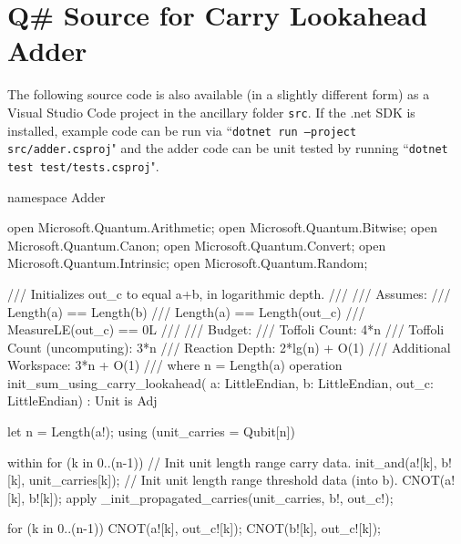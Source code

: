 \documentclass[onecolumn,unpublished]{quantumarticle}
\theoremstyle{definition}
\theoremstyle{definition}
\theoremstyle{definition}
\begin{document}
\section{Q\# Source for Carry Lookahead Adder}
\label{app:carryadder}

The following source code is also available (in a slightly different form) as a Visual Studio Code project in the ancillary folder \texttt{src}.
If the .net SDK is installed, example code can be run via ``\texttt{dotnet run --project src/adder.csproj}" and the adder code can be unit tested by running ``\texttt{dotnet test test/tests.csproj}".

\begin{qsharp}
namespace Adder {
    open Microsoft.Quantum.Arithmetic;
    open Microsoft.Quantum.Bitwise;
    open Microsoft.Quantum.Canon;
    open Microsoft.Quantum.Convert;
    open Microsoft.Quantum.Intrinsic;
    open Microsoft.Quantum.Random;

    /// Initializes out_c to equal a+b, in logarithmic depth.
    ///
    /// Assumes:
    ///     Length(a) == Length(b)
    ///     Length(a) == Length(out_c)
    ///     MeasureLE(out_c) == 0L
    ///
    /// Budget:
    ///     Toffoli Count: 4*n
    ///     Toffoli Count (uncomputing): 3*n
    ///     Reaction Depth: 2*lg(n) + O(1)
    ///     Additional Workspace: 3*n + O(1)
    ///     where n = Length(a)
    operation init_sum_using_carry_lookahead(
            a: LittleEndian,
            b: LittleEndian,
            out_c: LittleEndian) : Unit is Adj {
        let n = Length(a!);
        using (unit_carries = Qubit[n]) {
            within {
                for (k in 0..(n-1)) {
                    // Init unit length range carry data.
                    init_and(a![k], b![k], unit_carries[k]);
                    // Init unit length range threshold data (into b).
                    CNOT(a![k], b![k]);
                }
            } apply {
                _init_propagated_carries(unit_carries, b!, out_c!);
            }

            for (k in 0..(n-1)) {
                CNOT(a![k], out_c![k]);
                CNOT(b![k], out_c![k]);
            }
        }
    }

}
\end{qsharp}
\end{document}
